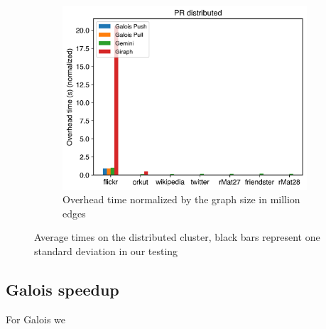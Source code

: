 \begin{figure}
\begin{subfigure}{0.3\textwidth}
		\includegraphics[width=\linewidth]{../../plots/distributedPR_overheadTimeNormalized.png}
		\caption{Overhead time normalized by the graph size in million edges}
		\label{fig:distributedPR_overheadNormalized}
	\end{subfigure}
	
	\caption{Average times on the distributed cluster, black bars represent one standard deviation in our testing}
\end{figure}















\subsection{Galois speedup}
\label{sec:galois_speedup}
For Galois we 


